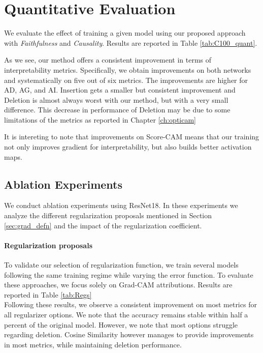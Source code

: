 \section{Quantitative Evaluation}
\label{sec:grad_quant}
We evaluate the effect of training a given model using our proposed approach with 
\textit{Faithfulness} and \textit{Causality}. Results are reported in Table \ref{tab:C100_quant}.

As we see, our method offers a consistent improvement in terms of interpretability metrics. 
Specifically, we obtain improvements on both networks and systematically on five out of six metrics. 
The improvements are higher for AD, AG, and AI. Insertion gets a smaller but consistent improvement 
and Deletion is almost always worst with our method, but with a very small difference.
This decrease in performance of Deletion may be due to some limitations of the metrics as reported 
in Chapter \ref{ch:opticam}

It is intereting to note that improvements on Score-CAM means that our training not only improves 
gradient for interpretability, but also builds better activation maps.

\subsection{Ablation Experiments}
We conduct ablation experiments using ResNet18. In these experiments we analyze the different 
regularization proposals mentioned in Section \ref{sec:grad_defn} and the impact of the 
regularization coefficient.

\paragraph{Regularization proposals} 
To validate our selection of regularization function, we train several models following the same 
training regime while varying the error function. To evaluate these approaches, we focus solely on 
Grad-CAM attributions. Results are reported in Table \ref{tab:Regs}\\

Following these results, we observe a consistent improvement on most metrics for all regularizer 
options. We note that the accuracy remains stable within half a percent of the original model.
However, we note that most options struggle regarding deletion. 
Cosine Similarity however manages to provide improvements in most metrics, while maintaining 
deletion performance.

